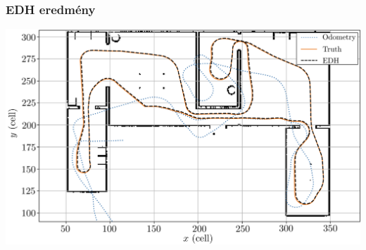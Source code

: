 \documentclass{beamer}
\begin{document}
\begin{frame}
    \frametitle{EDH eredmény}
    \includegraphics[width=\linewidth]{_Figures/EDH_crop.png}
\end{frame}
\end{document}

